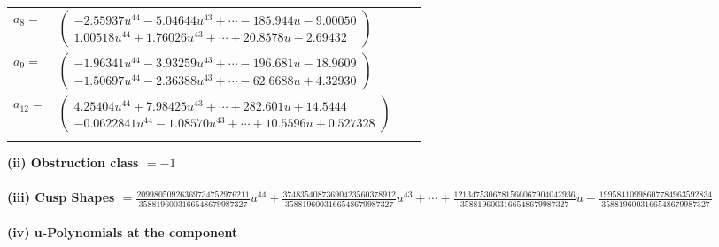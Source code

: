 \documentclass[1p]{elsarticle_modified}
\theoremstyle{definition}
\begin{document}
\begin{tabular}{m{7pt} m{180pt} m{7pt} m{180pt} }
\flushright $a_{8}=$&$\begin{pmatrix}-2.55937 u^{44}-5.04644 u^{43}+\cdots-185.944 u-9.00050\\1.00518 u^{44}+1.76026 u^{43}+\cdots+20.8578 u-2.69432\end{pmatrix}$ \\
\flushright $a_{9}=$&$\begin{pmatrix}-1.96341 u^{44}-3.93259 u^{43}+\cdots-196.681 u-18.9609\\-1.50697 u^{44}-2.36388 u^{43}+\cdots-62.6688 u+4.32930\end{pmatrix}$ \\
\flushright $a_{12}=$&$\begin{pmatrix}4.25404 u^{44}+7.98425 u^{43}+\cdots+282.601 u+14.5444\\-0.0622841 u^{44}-1.08570 u^{43}+\cdots+10.5596 u+0.527328\end{pmatrix}$\\&\end{tabular}
\flushleft \textbf{(ii) Obstruction class $= -1$}\\~\\
\flushleft \textbf{(iii) Cusp Shapes $= \frac{20998050926369734752976211}{3588196003166548679987327} u^{44}+\frac{37483540873690423560378912}{3588196003166548679987327} u^{43}+\cdots+\frac{1213475306781566067904042936}{3588196003166548679987327} u-\frac{19958410998607784963592834}{3588196003166548679987327}$}\\~\\
\newpage\renewcommand{\arraystretch}{1}
\flushleft \textbf{(iv) u-Polynomials at the component}\newline \\
\end{document}
